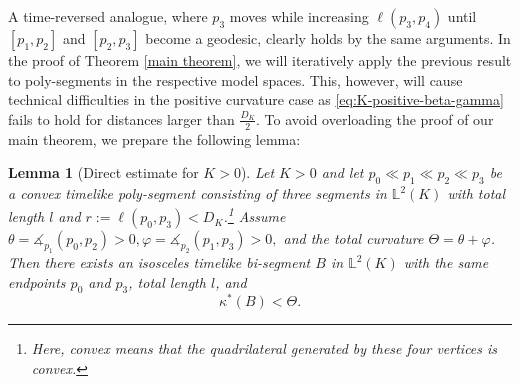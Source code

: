 \documentclass[hidelinks,12pt,a4paper]{article}
\numberwithin{equation}{section}
\theoremstyle{plain}
\newtheorem{lemma}[definition]{Lemma}
\theoremstyle{definition}
\newcommand{\lm}[1]{\mathbb{L}^2(#1)}
\newcommand{\ma}{\ensuremath{\measuredangle}}
\begin{document}
A time-reversed analogue, where $p_3$ moves while increasing $\ell(p_3,p_4)$ until $[p_1,p_2]$ and $[p_2,p_3]$ become a geodesic, clearly holds by the same arguments.
In the proof of Theorem \ref{main theorem}, we will iteratively apply the previous result to poly-segments in the respective model spaces.
This, however, will cause technical difficulties in the positive curvature case as \eqref{eq:K-positive-beta-gamma} fails to hold for distances larger than $\frac{D_K}{2}$.
To avoid overloading the proof of our main theorem, we prepare the following lemma:

\begin{lemma}[Direct estimate for $K > 0$]
\label{lem:positive_tri_segment_estimate}
Let $K>0$ and let $p_0\ll p_1\ll p_2\ll p_3$ be a convex timelike poly-segment consisting of three segments in $\lm{K}$ with total length $l$ and $ r:=\ell(p_0,p_3) < D_K$.\footnote{Here, convex means that the quadrilateral generated by these four vertices is convex.} Assume $\theta=\ma_{p_1}(p_0,p_2)>0,
\varphi=\ma_{p_2}(p_1,p_3)>0,$ and the total curvature $\Theta=\theta+\varphi$.
Then there exists an isosceles timelike bi-segment $B$ in $\lm{K}$ with the same endpoints
$p_0$ and $p_3$, total length $l$, and
\[
\kappa^*(B)< \Theta .
\]
\end{lemma}
\end{document}
